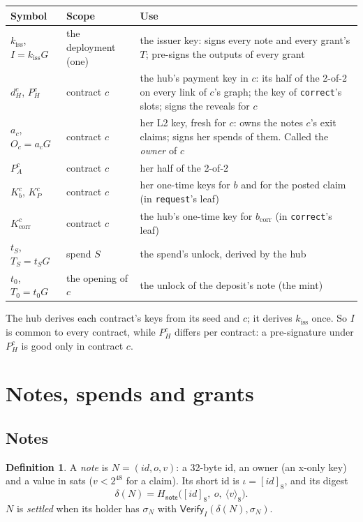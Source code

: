\documentclass[11pt]{article}
\theoremstyle{plain}
\theoremstyle{definition}
\newtheorem{definition}{Definition}
\newcommand{\bcorr}{b_{\mathrm{corr}}}
\newcommand{\tx}[1]{\texttt{#1}}
\newcommand{\be}[2]{\langle #1\rangle_{#2}}          %
\newcommand{\pre}[1]{[#1]_8}                         %
\newcommand{\Ht}[1]{H_{\textsf{#1}}}                 %
\newcommand{\Vfy}{\mathsf{Verify}}
\newcommand{\kiss}{k_{\mathrm{iss}}}
\newcommand{\PH}{P_H^{c}}
\newcommand{\dH}{d_H^{c}}
\newcommand{\Oc}{O_c}
\begin{document}
\begin{center}
\begin{tabularx}{\linewidth}{llL}
\toprule
Symbol & Scope & Use \\
\midrule
$\kiss$, $I = \kiss G$ & the deployment (one) & the issuer key: signs every note and every grant's $T$; pre-signs the outputs of every grant \\
$\dH$, $\PH$ & contract $c$ & the hub's payment key in $c$: its half of the 2-of-2 on every link of $c$'s graph; the key of \tx{correct}'s slots; signs the reveals for $c$ \\
$a_c$, $\Oc = a_c G$ & contract $c$ & her L2 key, fresh for $c$: owns the notes $c$'s exit claims; signs her spends of them. Called the \emph{owner} of $c$ \\
$P_A^c$ & contract $c$ & her half of the 2-of-2 \\
$K_b^c$, $K_P^c$ & contract $c$ & her one-time keys for $b$ and for the posted claim (in \tx{request}'s leaf) \\
$K_{\mathrm{corr}}^c$ & contract $c$ & the hub's one-time key for $\bcorr$ (in \tx{correct}'s leaf) \\
$t_S$, $T_S = t_S G$ & spend $S$ & the spend's unlock, derived by the hub \\
$t_0$, $T_0 = t_0G$ & the opening of $c$ & the unlock of the deposit's note (the mint) \\
\bottomrule
\end{tabularx}
\end{center}

The hub derives each contract's keys from its seed and $c$; it derives
$\kiss$ once. So $I$ is common to every contract, while $\PH$ differs per
contract: a pre-signature under $\PH$ is good only in contract $c$.

\section{Notes, spends and grants}

\subsection{Notes}

\begin{definition}
A \emph{note} is $N = (\mathit{id}, o, v)$: a 32-byte id, an owner (an
x-only key) and a value in sats ($v < 2^{48}$ for a claim). Its short id
is $\iota = \pre{\mathit{id}}$, and its digest
\[
  \delta(N) = \Ht{note}\big(\pre{\mathit{id}},\ o,\ \be{v}{8}\big).
\]
$N$ is \emph{settled} when its holder has $\sigma_N$ with
$\Vfy_I(\delta(N), \sigma_N)$.
\end{definition}
\end{document}
